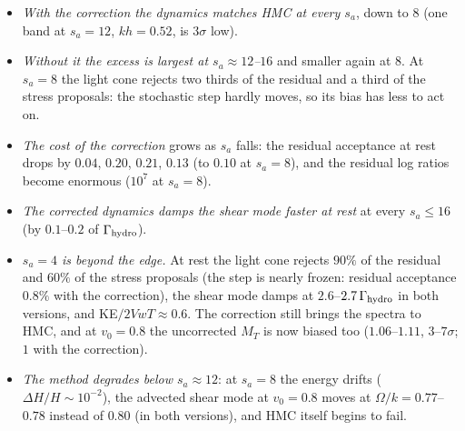 \documentclass[11pt,aps,preprint,nofootinbib,superscriptaddress,tightenlines]{revtex4-2}
\begin{document}
\begin{itemize}
\item \emph{With the correction the dynamics matches HMC at every $s_a$}, down to $8$ (one band at $s_a=12$, $kh=0.52$, is $3\sigma$ low).
\item \emph{Without it the excess is largest at $s_a\approx12$--$16$} and smaller again at $8$.  At $s_a=8$ the light cone rejects two thirds of the residual
  and a third of the stress proposals: the stochastic step hardly moves, so its bias has less to act on.
\item \emph{The cost of the correction} grows as $s_a$ falls: the residual acceptance at rest drops by $0.04$, $0.20$, $0.21$, $0.13$ (to $0.10$ at $s_a=8$), and the
  residual log ratios become enormous ($10^7$ at $s_a=8$).
\item \emph{The corrected dynamics damps the shear mode faster at rest} at every $s_a\le16$ (by $0.1$--$0.2$ of $\Gamma_{\rm hydro}$).
\item \emph{$s_a=4$ is beyond the edge.}  At rest the light cone rejects $90\%$ of the residual and $60\%$ of the stress proposals (the step is
  nearly frozen: residual acceptance $0.8\%$ with the correction), the shear mode damps at $2.6$--$2.7\,\Gamma_{\rm hydro}$ in both versions, and KE$/2VwT\approx0.6$.  The
  correction still brings the spectra to HMC, and at $v_0=0.8$ the uncorrected $M_T$ is now biased too ($1.06$--$1.11$, $3$--$7\sigma$; $1$ with the correction).
\item \emph{The method degrades below $s_a\approx12$}: at $s_a=8$ the energy drifts ($\Delta H/H\sim10^{-2}$), the advected shear mode at $v_0=0.8$ moves at
  $\Omega/k=0.77$--$0.78$ instead of $0.80$ (in both versions), and HMC itself begins to fail.
\end{itemize}
\end{document}
